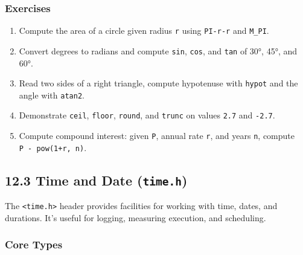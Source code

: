 \documentclass[
  letterpaper,
  DIV=11,
  numbers=noendperiod]{scrreprt}
\providecommand{\tightlist}{%
  \setlength{\itemsep}{0pt}\setlength{\parskip}{0pt}}
\begin{document}
\subsubsection{Exercises}\label{exercises-56}

\begin{enumerate}
\def\labelenumi{\arabic{enumi}.}
\tightlist
\item
  Compute the area of a circle given radius \texttt{r} using
  \texttt{PI-r-r} and \texttt{M\_PI}.
\item
  Convert degrees to radians and compute \texttt{sin}, \texttt{cos}, and
  \texttt{tan} of 30°, 45°, and 60°.
\item
  Read two sides of a right triangle, compute hypotenuse with
  \texttt{hypot} and the angle with \texttt{atan2}.
\item
  Demonstrate \texttt{ceil}, \texttt{floor}, \texttt{round}, and
  \texttt{trunc} on values \texttt{2.7} and \texttt{-2.7}.
\item
  Compute compound interest: given \texttt{P}, annual rate \texttt{r},
  and years \texttt{n}, compute \texttt{P\ -\ pow(1+r,\ n)}.
\end{enumerate}

\subsection{\texorpdfstring{12.3 Time and Date
(\texttt{time.h})}{12.3 Time and Date (time.h)}}\label{time-and-date-time.h}

The \texttt{\textless{}time.h\textgreater{}} header provides facilities
for working with time, dates, and durations. It's useful for logging,
measuring execution, and scheduling.

\subsubsection{Core Types}\label{core-types}
\end{document}
